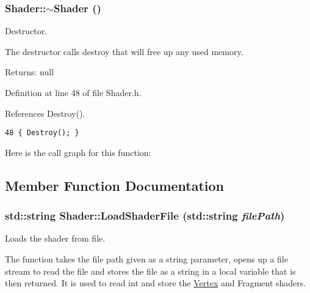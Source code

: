 \hypertarget{class_shader_ff01df87e8a102f270b5b135a295e59d}{
\subsubsection[$\sim$Shader]{\setlength{\rightskip}{0pt plus 5cm}Shader::$\sim$Shader ()}}
\label{class_shader_ff01df87e8a102f270b5b135a295e59d}


Destructor. 

The destructor calls destroy that will free up any used memory.

\begin{Desc}
\item[Returns:]null \end{Desc}


Definition at line 48 of file Shader.h.

References Destroy().

\begin{Code}\begin{verbatim}48 { Destroy(); }
\end{verbatim}
\end{Code}




Here is the call graph for this function:

\subsection{Member Function Documentation}
\hypertarget{class_shader_c843ecd8274ea7507df0edf2f4e6a794}{
\subsubsection[LoadShaderFile]{\setlength{\rightskip}{0pt plus 5cm}std::string Shader::LoadShaderFile (std::string {\em filePath})}}
\label{class_shader_c843ecd8274ea7507df0edf2f4e6a794}


Loads the shader from file. 

The function takes the file path given as a string parameter, opens up a file stream to read the file and stores the file as a string in a local variable that is then returned. It is used to read int and store the \hyperlink{class_vertex}{Vertex} and Fragment shaders.


